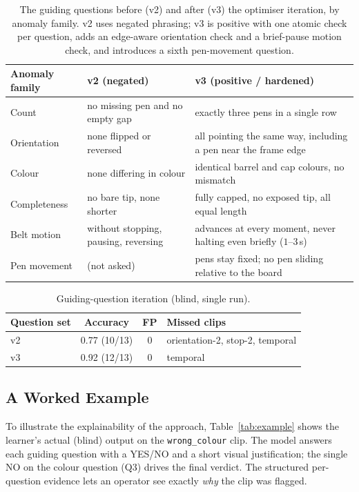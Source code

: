 \begin{table}[!htbp]
\centering
\footnotesize
\caption{\label{tab:questions}The guiding questions before (v2) and after (v3) the
optimiser iteration, by anomaly family. v2 uses negated phrasing; v3 is positive with one
atomic check per question, adds an edge-aware orientation check and a brief-pause motion
check, and introduces a sixth pen-movement question.}
\begin{tabular}{l|p{4.4cm}|p{5.3cm}}
\hline
Anomaly family & v2 (negated) & v3 (positive / hardened) \\
\hline
Count        & no missing pen and no empty gap      & exactly three pens in a single row \\
Orientation  & none flipped or reversed             & all pointing the same way, including a pen near the frame edge \\
Colour       & none differing in colour             & identical barrel and cap colours, no mismatch \\
Completeness & no bare tip, none shorter            & fully capped, no exposed tip, all equal length \\
Belt motion  & without stopping, pausing, reversing & advances at every moment, never halting even briefly ($1$--$3$\,s) \\
Pen movement & (not asked)                          & pens stay fixed; no pen sliding relative to the board \\
\hline
\end{tabular}
\end{table}

\begin{table}[!htbp]
\centering
\caption{\label{tab:qiter}Guiding-question iteration (blind, single run).}
\begin{tabular}{l|c|c|l}
\hline
Question set & Accuracy & FP & Missed clips \\
\hline
v2 & 0.77 (10/13) & 0 & orientation-2, stop-2, temporal \\
v3 & 0.92 (12/13) & 0 & temporal \\
\hline
\end{tabular}
\end{table}

\subsection{A Worked Example}
To illustrate the explainability of the approach, Table~\ref{tab:example} shows the
learner's actual (blind) output on the \texttt{wrong\_colour} clip. The model answers
each guiding question with a YES/NO and a short visual justification; the single NO on the
colour question (Q3) drives the final verdict. The structured per-question evidence lets
an operator see exactly \emph{why} the clip was flagged.

